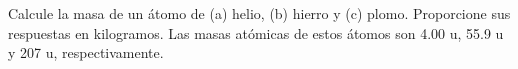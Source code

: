 \item Calcule la masa de un átomo de (a) helio, (b) hierro y (c) plomo. Proporcione sus respuestas en kilogramos. Las masas atómicas de estos átomos son 4.00 u, 55.9 u y 207 u, respectivamente.
